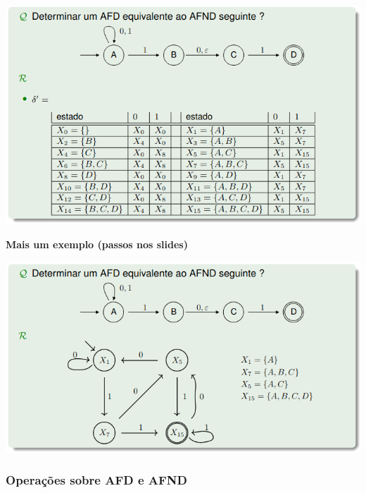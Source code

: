 \documentclass{article}
\begin{document}
\begin{flushleft}
  \begin{center}
    \includegraphics[scale=0.4]{56}
  \end{center}

  \pagebreak

  \textbf{Mais um exemplo (passos nos slides)}

  \begin{center}
    \includegraphics[scale=0.4]{57}
  \end{center}
\end{flushleft}

\subsubsection{Operações sobre AFD e AFND}
\end{document}
